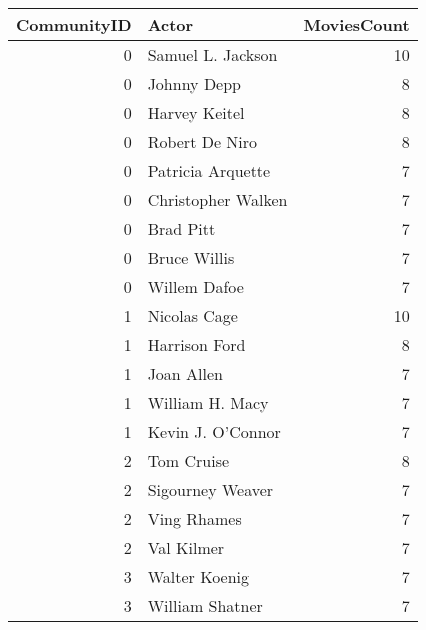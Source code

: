\begin{tabular}{rlr}
\toprule
CommunityID & Actor & MoviesCount \\
\midrule
0 & Samuel L. Jackson & 10 \\
0 & Johnny Depp & 8 \\
0 & Harvey Keitel & 8 \\
0 & Robert De Niro & 8 \\
0 & Patricia Arquette & 7 \\
0 & Christopher Walken & 7 \\
0 & Brad Pitt & 7 \\
0 & Bruce Willis & 7 \\
0 & Willem Dafoe & 7 \\
1 & Nicolas Cage & 10 \\
1 & Harrison Ford & 8 \\
1 & Joan Allen & 7 \\
1 & William H. Macy & 7 \\
1 & Kevin J. O'Connor & 7 \\
2 & Tom Cruise & 8 \\
2 & Sigourney Weaver & 7 \\
2 & Ving Rhames & 7 \\
2 & Val Kilmer & 7 \\
3 & Walter Koenig & 7 \\
3 & William Shatner & 7 \\
\bottomrule
\end{tabular}
